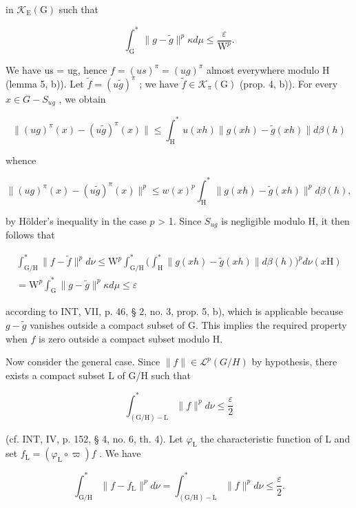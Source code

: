 in \(\mathcal{K}_{\mathrm{E}}(\mathrm{G})\) such that

\[
\int_ {\mathrm{G}} ^ {*} \| g - \widetilde {g} \| ^ {p} \kappa d \mu \leqslant \frac {\varepsilon}{\mathrm{W} ^ {p}}.
\]

We have us = ug, hence \(f = (us)^{\pi} = (ug)^{\pi}\) almost everywhere modulo H (lemma 5, b)). Let \(\widetilde{f} = (u\widetilde{g})^{\pi}\) ; we have \(\widetilde{f} \in \mathcal{K}_{\pi}(\mathrm{G})\) (prop. 4, b)). For every \(x \in G - S_{ug}\) , we obtain

\[
\| (u g) ^ {\pi} (x) - (u \widetilde {g}) ^ {\pi} (x) \| \leqslant \int_ {\mathrm{H}} ^ {*} u (x h) \| g (x h) - \widetilde {g} (x h) \| d \beta (h)
\]

whence

\[
\| (u g) ^ {\pi} (x) - (u \widetilde {g}) ^ {\pi} (x) \| ^ {p} \leqslant w (x) ^ {p} \int_ {\mathrm{H}} ^ {*} \| g (x h) - \widetilde {g} (x h) \| ^ {p} d \beta (h),
\]

by Hölder's inequality in the case \( p \) \textgreater{} 1. Since \(S_{ug}\) is negligible modulo H, it then follows that

\[
\begin{array}{c} \int_ {\mathrm{G/H}} ^ {*} \| f - \widetilde {f} \| ^ {p} d \nu \leqslant \mathrm{W} ^ {p} \int_ {\mathrm{G/H}} ^ {*} \Big (\int_ {\mathrm{H}} ^ {*} \| g (x h) - \widetilde {g} (x h) \| d \beta (h) \Big) ^ {p} d \nu (x \mathrm{H}) \\ = \mathrm{W} ^ {p} \int_ {\mathrm{G}} ^ {*} \| g - \widetilde {g} \| ^ {p} \kappa d \mu \leqslant \varepsilon \end{array}
\]

according to INT, VII, p. 46, § 2, no. 3, prop. 5, b), which is applicable because \(g - \widetilde{g}\) vanishes outside a compact subset of G. This implies the required property when \(f\) is zero outside a compact subset modulo H.

Now consider the general case. Since \(\|f\|\in\mathcal{L}^{p}(G/H)\) by hypothesis, there exists a compact subset L of G/H such that

\[
\int_ {(\mathrm{G} / \mathrm{H}) - \mathrm{L}} ^ {*} \| f \| ^ {p} d \nu \leqslant \frac {\varepsilon}{2}
\]

(cf. INT, IV, p. 152, § 4, no. 6, th. 4). Let \(\varphi_{\mathrm{L}}\) the characteristic function of L and set \(f_{\mathrm{L}} = (\varphi_{\mathrm{L}} \circ \varpi)f\) . We have

\[
\int_ {\mathrm{G} / \mathrm{H}} ^ {*} \| f - f _ {\mathrm{L}} \| ^ {p} d \nu = \int_ {(\mathrm{G} / \mathrm{H}) - \mathrm{L}} ^ {*} \| f \| ^ {p} d \nu \leqslant \frac {\varepsilon}{2}.
\]

